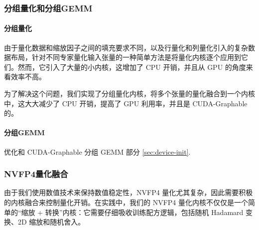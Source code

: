

\subsubsection{分组量化和分组GEMM}

\paragraph{分组量化}

由于量化数据和缩放因子之间的填充要求不同，以及行量化和列量化引入的复杂数据布局，针对不同专家量化输入张量的一种简单方法是将量化内核逐个应用到它们。然而，它引入了大量的小内核，这增加了 CPU 开销，并且从 GPU 的角度来看效率不高。

为了解决这个问题，我们实现了分组量化内核，将多个张量的量化融合到一个内核中，这大大减少了 CPU 开销，提高了 GPU 利用率，并且是 CUDA-Graphable 的。

\paragraph{分组GEMM}
优化和 CUDA-Graphable 分组 GEMM 部分 \ref{sec:device-init}.


\subsubsection{NVFP4量化融合}\label{sec:fp4-quant-fusion}

由于我们使用数值技术来保持数值稳定性，NVFP4 量化尤其复杂，因此需要积极的内核融合来控制量化开销。在实践中，我们的 NVFP4 量化内核不仅仅是一个简单的“缩放 + 转换”内核：它需要仔细吸收训练配方逻辑，包括随机 Hadamard 变换、2D 缩放和随机舍入。 

